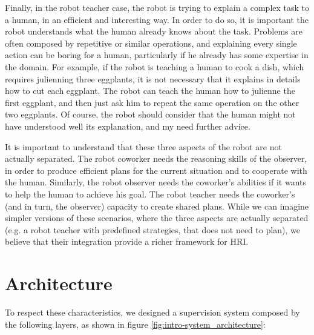 Finally, in the robot teacher case, the robot is trying to explain a complex task to a human, in an efficient and interesting way. In order to do so, it is important the robot understands what the human already knows about the task. Problems are often composed by repetitive or similar operations, and explaining every single action can be boring for a human, particularly if he already has some expertise in the domain. For example, if the robot is teaching a human to cook a dish, which requires julienning three eggplants, it is not necessary that it explains in details how to cut each eggplant. The robot can teach the human how to julienne the first eggplant, and then just ask him to repeat the same operation on the other two eggplants. Of course, the robot should consider that the human might not have understood well its explanation, and my need further advice.  

It is important to understand that these three aspects of the robot are not actually separated. The robot coworker needs the reasoning skills of the observer, in order to produce efficient plans for the current situation and to cooperate with the human. Similarly, the robot observer needs the coworker's abilities if it wants to help the human to achieve his goal. The robot teacher needs the coworker's (and in turn, the observer) capacity to create shared plans. While we can imagine simpler versions of these scenarios, where the three aspects are actually separated (e.g. a robot teacher with predefined strategies, that does not need to plan), we believe that their integration provide a richer framework for HRI.


\section{Architecture}
\label{sec:overview-architecture}
To respect these characteristics, we designed a supervision system composed by the following layers, as shown in figure \ref{fig:intro-system_architecture}:

